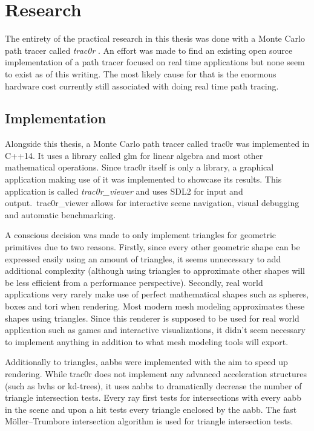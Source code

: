 \documentclass[
  twoside,
  11pt, a4paper,
  footinclude=true,
  headinclude=true,
  cleardoublepage=empty
]{scrreprt}
\begin{document}
\chapter{Research}
The entirety of the practical research in this thesis was done with a Monte Carlo path tracer called
\emph{trac0r} \cite{site:trac0r}.
An effort was made to find an existing open source implementation of a path tracer focused on
real time applications but none seem to exist as of this writing. The most likely cause for that is
the enormous hardware cost currently still associated with doing real time path tracing.

\section{Implementation}
Alongside this thesis, a Monte Carlo path tracer called trac0r \cite{site:trac0r} was implemented in
C++14. It uses a library called glm \cite{site:glm} for linear algebra and most
other mathematical operations. Since trac0r itself is only a library, a graphical application making use
of it was implemented to showcase its results. This application is called \emph{trac0r\_viewer} and
uses SDL2 \cite{wiki:sdl} for input and output.\ trac0r\_viewer allows for interactive scene
navigation, visual debugging and automatic benchmarking.

A conscious decision was made to
only implement triangles for geometric primitives due to two reasons. Firstly, since every
other geometric shape can be expressed easily using an amount of triangles, it seems unnecessary to
add additional complexity (although using triangles to approximate other shapes will be less
efficient from a performance perspective). Secondly, real world applications very rarely make use of perfect
mathematical shapes such as spheres, boxes and tori when rendering. Most modern mesh modeling
approximates these shapes using triangles. Since this renderer is supposed to be used for real
world application such as games and interactive visualizations, it didn't seem necessary to
implement anything in addition to what mesh modeling tools will export. 

Additionally to triangles, \acp{aabb} were implemented with the aim to speed up rendering. While
trac0r does not implement any advanced acceleration structures (such as \acp{bvh} or kd-trees),
it uses \acp{aabb} to
dramatically decrease the number of triangle intersection tests. Every ray first tests for
intersections with every \ac{aabb} in the scene and upon a hit tests every triangle enclosed by the
\ac{aabb}. The fast Möller–Trumbore intersection algorithm \cite{inproceedings:moller2005fast} is used for
triangle intersection tests.
\end{document}
